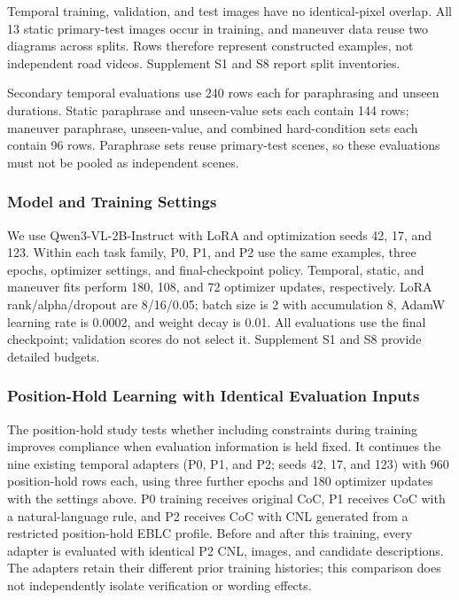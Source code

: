 \documentclass[nolineno]{ieeeaccess}
\begin{document}
Temporal training, validation, and test images have no identical-pixel overlap. All 13 static primary-test images occur in training, and maneuver data reuse two diagrams across splits. Rows therefore represent constructed examples, not independent road videos. Supplement S1 and S8 report split inventories.\par

Secondary temporal evaluations use 240 rows each for paraphrasing and unseen durations. Static paraphrase and unseen-value sets each contain 144 rows; maneuver paraphrase, unseen-value, and combined hard-condition sets each contain 96 rows. Paraphrase sets reuse primary-test scenes, so these evaluations must not be pooled as independent scenes.\par

\subsubsection{Model and Training Settings}

We use Qwen3-VL-2B-Instruct with LoRA and optimization seeds 42, 17, and 123. Within each task family, P0, P1, and P2 use the same examples, three epochs, optimizer settings, and final-checkpoint policy. Temporal, static, and maneuver fits perform 180, 108, and 72 optimizer updates, respectively. LoRA rank/alpha/dropout are 8/16/0.05; batch size is 2 with accumulation 8, AdamW learning rate is 0.0002, and weight decay is 0.01. All evaluations use the final checkpoint; validation scores do not select it. Supplement S1 and S8 provide detailed budgets.\par

\subsubsection{Position-Hold Learning with Identical Evaluation Inputs}\label{sec:position-hold-setup}

The position-hold study tests whether including constraints during training improves compliance when evaluation information is held fixed. It continues the nine existing temporal adapters (P0, P1, and P2; seeds 42, 17, and 123) with 960 position-hold rows each, using three further epochs and 180 optimizer updates with the settings above. P0 training receives original CoC, P1 receives CoC with a natural-language rule, and P2 receives CoC with CNL generated from a restricted position-hold EBLC profile. Before and after this training, every adapter is evaluated with identical P2 CNL, images, and candidate descriptions. The adapters retain their different prior training histories; this comparison does not independently isolate verification or wording effects.\par
\end{document}
